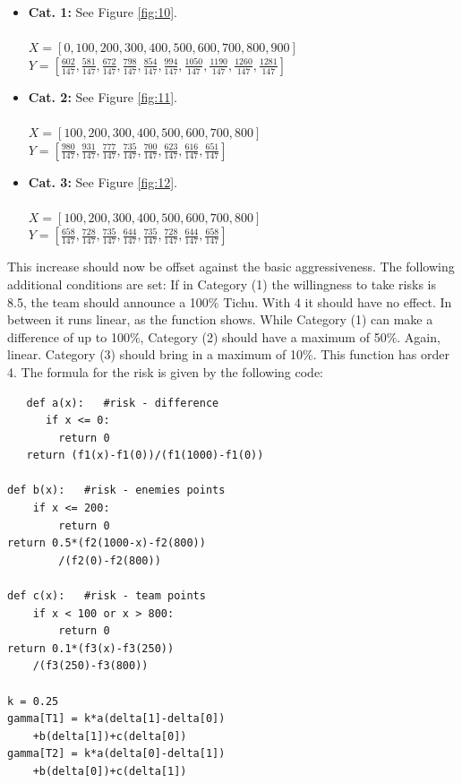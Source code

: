 \begin{itemize}
	\item \textbf{Cat. 1:} See Figure \ref{fig:10}.\\ \\
			$X=[0,100,200,300,400,500,600,700,800,900]$\\
			$Y=[\frac{602}{147},\frac{581}{147},\frac{672}{147},\frac{798}{147},\frac{854}{147},\frac{994}{147},\frac{1050}{147},\frac{1190}{147},\frac{1260}{147},\frac{1281}{147}]$ \\
	\item \textbf{Cat. 2:} See Figure \ref{fig:11}.\\ \\
			$X=[100,200,300,400,500,600,700,800]$\\
			$Y=[\frac{980}{147},\frac{931}{147},\frac{777}{147},\frac{735}{147},\frac{700}{147},\frac{623}{147},\frac{616}{147},\frac{651}{147}]$ \\
	\item \textbf{Cat. 3:} See Figure \ref{fig:12}.\\ \\
$X=[100,200,300,400,500,600,700,800]$\\
$Y=[\frac{658}{147},\frac{728}{147},\frac{735}{147},\frac{644}{147},\frac{735}{147},\frac{728}{147},\frac{644}{147},\frac{658}{147}]$ \\
\end{itemize}

This increase should now be offset against the basic aggressiveness.
The following additional conditions are set:
If in Category (1) the willingness to take risks is 8.5, the team should announce a 100$\%$ Tichu. With 4 it should have no effect.  In between it runs linear, as the function shows.
While Category (1) can make a difference of up to 100$\%$, Category (2) should have a maximum of 50$\%$. Again, linear.
Category (3) should bring in a maximum of 10$\%$. This function has order 4. The formula for the risk is given by the following code:

\begin{lstlisting}
   def a(x):   #risk - difference
      if x <= 0:
        return 0
   return (f1(x)-f1(0))/(f1(1000)-f1(0))
            
def b(x):   #risk - enemies points
    if x <= 200:
        return 0
return 0.5*(f2(1000-x)-f2(800))
		/(f2(0)-f2(800))
        
def c(x):   #risk - team points
    if x < 100 or x > 800:
        return 0
return 0.1*(f3(x)-f3(250))
	/(f3(250)-f3(800))

k = 0.25    
gamma[T1] = k*a(delta[1]-delta[0])
	+b(delta[1])+c(delta[0]) 
gamma[T2] = k*a(delta[0]-delta[1])
	+b(delta[0])+c(delta[1])

\end{lstlisting}



